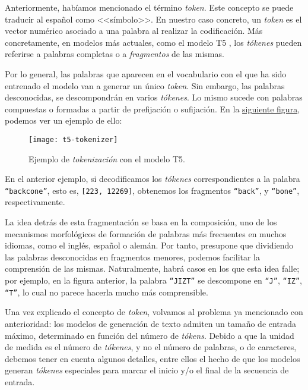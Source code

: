 Anteriormente, habíamos mencionado el término \emph{token}. Este concepto se puede traducir al español como <<símbolo>>. En nuestro caso concreto, un \emph{token} es el vector numérico asociado a una palabra al realizar la codificación. Más concretamente, en modelos más actuales, como el modelo T5 \cite{raffel19}, los \emph{tókenes} pueden referirse a palabras completas o a \emph{fragmentos} de las mismas.

Por lo general, las palabras que aparecen en el vocabulario con el que ha sido entrenado el modelo van a generar un único \emph{token}. Sin embargo, las palabras desconocidas, se descompondrán en varios \emph{tókenes}. Lo mismo sucede con palabras compuestas o formadas a partir de prefijación o sufijación. En la \hyperref[fig:t5-tokenizer]{siguiente figura}, podemos ver un ejemplo de ello:

\begin{figure}[h]
	\centering
	\texttt{[image: t5-tokenizer]}
	\caption{Ejemplo de \emph{tokenización} con el modelo T5.}
	\label{fig:t5-tokenizer}
\end{figure}

En el anterior ejemplo, si decodificamos los \emph{tókenes} correspondientes a la palabra \texttt{``backcone''}, esto es, \texttt{[223, 12269]}, obtenemos los fragmentos \texttt{``back''}, y \texttt{``bone''}, respectivamente.

La idea detrás de esta fragmentación se basa en la composición, uno de los mecanismos morfológicos de formación de palabras más frecuentes \cite{cetnarowska05} en muchos idiomas, como el inglés, español o alemán. Por tanto, presupone que dividiendo las palabras desconocidas en fragmentos menores, podemos facilitar la comprensión de las mismas. Naturalmente, habrá casos en los que esta idea falle; por ejemplo, en la figura anterior, la palabra \texttt{``JIZT''} se descompone en \texttt{``J''}, \texttt{``IZ''}, \texttt{``T''}, lo cual no parece hacerla mucho más comprensible.

Una vez explicado el concepto de \emph{token}, volvamos al problema ya mencionado con anterioridad: los modelos de generación de texto admiten un tamaño de entrada máximo, determinado en función del número de \emph{tókens}. Debido a que la unidad de medida es el número de \emph{tókenes}, y no el número de palabras, o de caracteres, debemos tener en cuenta algunos detalles, entre ellos el hecho de que los modelos generan \emph{tókenes} especiales para marcar el inicio y/o el final de la secuencia de entrada.

